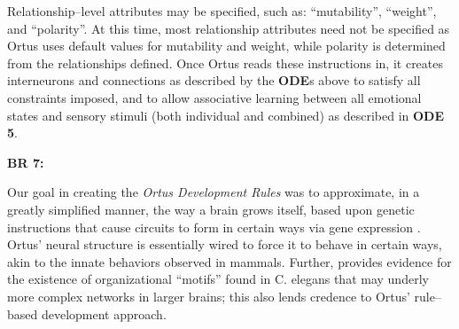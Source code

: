 \documentclass[letterpaper]{article}
\begin{document}
Relationship--level attributes may be specified, such as: ``mutability'', ``weight'', and ``polarity''. At this time, most relationship attributes need not be specified as Ortus uses default values for mutability and weight, while polarity is determined from the relationships defined. Once Ortus reads these instructions in, it creates interneurons and connections as described by the \textbf{ODE}s above to satisfy all constraints imposed, and to allow associative learning between all emotional states and sensory stimuli (both individual and combined) as described in \textbf{ODE 5}.


\textbf{BR 7:}

Our goal in creating the \textit{Ortus Development Rules} was to approximate, in a greatly simplified manner, the way a brain grows itself, based upon genetic instructions that cause circuits to form in certain ways via gene expression \citep{Weiner2015}. Ortus' neural structure is essentially wired to force it to behave in certain ways, akin to the innate behaviors observed in mammals. Further, \citet{Schroter2017} provides evidence for the existence of organizational ``motifs'' found in C. elegans that may underly more complex networks in larger brains; this also lends credence to Ortus' rule--based development approach.





\end{document}
